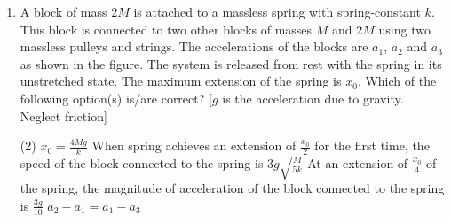 
\begin{enumerate}
    \item A block of mass \(2M\) is attached to a massless spring with spring-constant \(k\). This block is connected to two other blocks of masses \(M\) and \(2M\) using two massless pulleys and strings. The accelerations of the blocks are \(a_1\), \(a_2\) and \(a_3\) as shown in the figure. The system is released from rest with the spring in its unstretched state. The maximum extension of the spring is \(x_0\). Which of the following option(s) is/are correct? [\(g\) is the acceleration due to gravity. Neglect friction]
        \begin{tasks}(2)
            \task \(x_0 = \frac{4Mg}{k}\)
            \task When spring achieves an extension of \(\frac{x_0}{2}\) for the first time, the speed of the block connected to the spring is \(3g\sqrt{\frac{M}{5k}}\)
            \task At an extension of \(\frac{x_0}{4}\) of the spring, the magnitude of acceleration of the block connected to the spring is \(\frac{3g}{10}\)
            \task \(a_2 - a_1 = a_1 - a_3\)
        \end{tasks}
\end{enumerate}
\begin{center}
\end{center}
